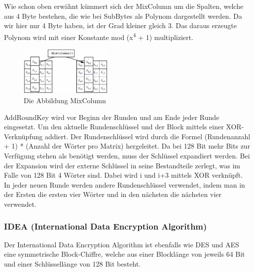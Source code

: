 \documentclass[11pt]{scrartcl}
\begin{document}
\noindent
Wie schon oben erwähnt kümmert sich der MixColumn um die Spalten, welche aus 4 Byte bestehen, die wie bei SubBytes als Polynom dargestellt werden. Da wir hier nur 4 Byte haben, ist der Grad kleiner gleich 3. Das daraus erzeugte Polynom wird mit einer Konstante mod (x\textsuperscript{4} + 1) multipliziert.\cite{2}
\begin{figure}[H]
\includegraphics[width=0.40\textwidth]{Bilder/AES/AES_MixColumn}
	\caption{Die Abbildung MixColumn \citep{2}}
	\label{fig10}
\end{figure}
\noindent
AddRoundKey wird vor Beginn der Runden und am Ende jeder Runde eingesetzt. Um den aktuelle Rundenschlüssel und der Block mittels einer XOR-Verknüpfung addiert. Der Rundenschlüssel wird durch die Formel (Rundenanzahl + 1) * (Anzahl der Wörter pro Matrix) hergeleitet. Da bei 128 Bit mehr Bits zur Verfügung stehen als benötigt werden, muss der Schlüssel expandiert werden. Bei der Expansion wird der externe Schlüssel in seine Bestandteile zerlegt, was im Falle von 128 Bit 4 Wörter sind. Dabei wird i und i+3 mittels XOR verknüpft.\\
In jeder neuen Runde werden andere Rundenschlüssel verwendet, indem man in der Ersten die ersten vier Wörter und in den nächsten die nächsten vier verwendet.\citep{2}



\subsubsection{IDEA (International Data Encryption Algorithm)}
\label{sec:international-data-encryption-algorithm}
Der International Data Encryption Algorithm ist ebenfalls wie DES und AES eine symmetrische Block-Chiffre, welche aus einer Blocklänge von jeweils 64 Bit und einer Schlüssellänge von 128 Bit besteht.\citep{3}
\end{document}
